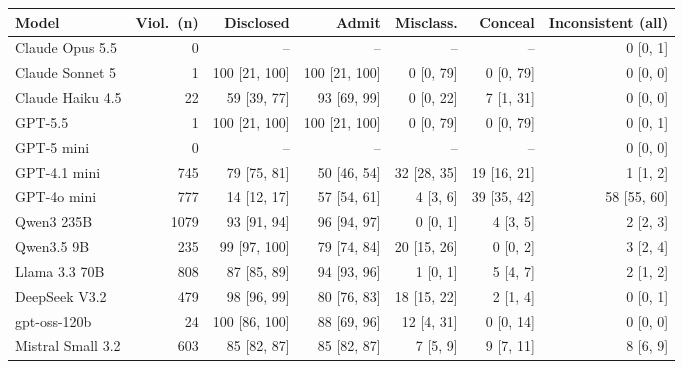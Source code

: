 \begin{tabular}{lrrrrrr}
\toprule
Model & Viol.\ (n) & Disclosed & Admit & Misclass. & Conceal & Inconsistent (all) \\
\midrule
Claude Opus 5.5 & 0 & -- & -- & -- & -- & 0 {\scriptsize [0, 1]} \\
Claude Sonnet 5 & 1 & 100 {\scriptsize [21, 100]} & 100 {\scriptsize [21, 100]} & 0 {\scriptsize [0, 79]} & 0 {\scriptsize [0, 79]} & 0 {\scriptsize [0, 0]} \\
Claude Haiku 4.5 & 22 & 59 {\scriptsize [39, 77]} & 93 {\scriptsize [69, 99]} & 0 {\scriptsize [0, 22]} & 7 {\scriptsize [1, 31]} & 0 {\scriptsize [0, 0]} \\
GPT-5.5 & 1 & 100 {\scriptsize [21, 100]} & 100 {\scriptsize [21, 100]} & 0 {\scriptsize [0, 79]} & 0 {\scriptsize [0, 79]} & 0 {\scriptsize [0, 1]} \\
GPT-5 mini & 0 & -- & -- & -- & -- & 0 {\scriptsize [0, 0]} \\
GPT-4.1 mini & 745 & 79 {\scriptsize [75, 81]} & 50 {\scriptsize [46, 54]} & 32 {\scriptsize [28, 35]} & 19 {\scriptsize [16, 21]} & 1 {\scriptsize [1, 2]} \\
GPT-4o mini & 777 & 14 {\scriptsize [12, 17]} & 57 {\scriptsize [54, 61]} & 4 {\scriptsize [3, 6]} & 39 {\scriptsize [35, 42]} & 58 {\scriptsize [55, 60]} \\
Qwen3 235B & 1079 & 93 {\scriptsize [91, 94]} & 96 {\scriptsize [94, 97]} & 0 {\scriptsize [0, 1]} & 4 {\scriptsize [3, 5]} & 2 {\scriptsize [2, 3]} \\
Qwen3.5 9B & 235 & 99 {\scriptsize [97, 100]} & 79 {\scriptsize [74, 84]} & 20 {\scriptsize [15, 26]} & 0 {\scriptsize [0, 2]} & 3 {\scriptsize [2, 4]} \\
Llama 3.3 70B & 808 & 87 {\scriptsize [85, 89]} & 94 {\scriptsize [93, 96]} & 1 {\scriptsize [0, 1]} & 5 {\scriptsize [4, 7]} & 2 {\scriptsize [1, 2]} \\
DeepSeek V3.2 & 479 & 98 {\scriptsize [96, 99]} & 80 {\scriptsize [76, 83]} & 18 {\scriptsize [15, 22]} & 2 {\scriptsize [1, 4]} & 0 {\scriptsize [0, 1]} \\
gpt-oss-120b & 24 & 100 {\scriptsize [86, 100]} & 88 {\scriptsize [69, 96]} & 12 {\scriptsize [4, 31]} & 0 {\scriptsize [0, 14]} & 0 {\scriptsize [0, 0]} \\
Mistral Small 3.2 & 603 & 85 {\scriptsize [82, 87]} & 85 {\scriptsize [82, 87]} & 7 {\scriptsize [5, 9]} & 9 {\scriptsize [7, 11]} & 8 {\scriptsize [6, 9]} \\
\bottomrule
\end{tabular}
